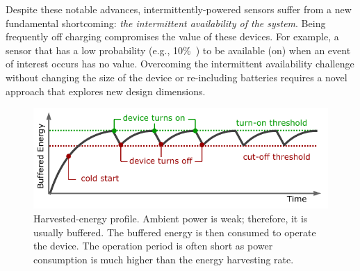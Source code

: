 Despite these notable advances, intermittently-powered sensors suffer from a new fundamental shortcoming: \textit{the intermittent availability of the system}. Being frequently off charging compromises the value of these devices. For example, a sensor that has a low probability (e.g., 10\%~\cite{coala}) to be available (on) when an event of interest occurs has no value. 
Overcoming the intermittent availability challenge without changing the size of the device or re-including batteries requires a novel approach that explores new design dimensions. 
%
\begin{figure}[b]
	\centering
		\includegraphics[width=\columnwidth]{figures/intermittent_operation}
		\caption{Harvested-energy profile. Ambient power is weak; therefore, it is usually buffered. The buffered energy is then consumed to operate the device. The operation period is often short as power consumption is much higher than the energy harvesting rate.}
		\label{fig:intermittent_opertaion}
\end{figure} 
%
